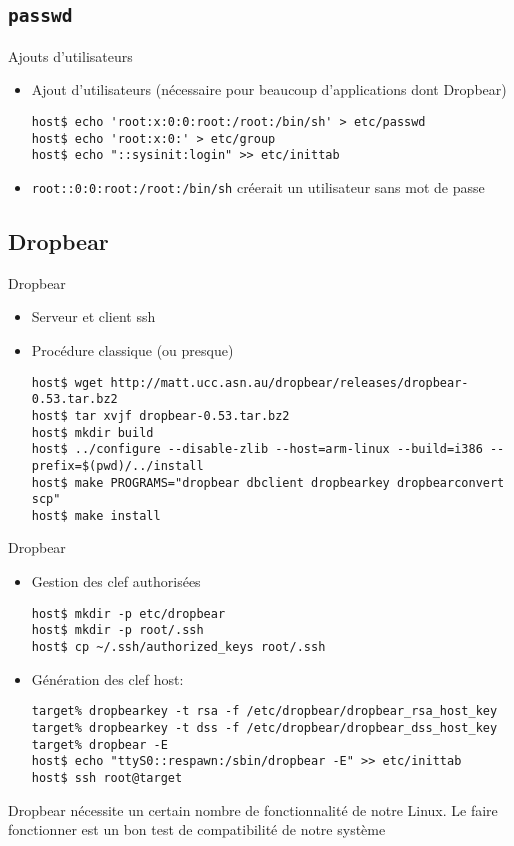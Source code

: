 \subsection{\texttt{passwd}}

\begin{frame}[fragile=singleslide]{Ajouts d'utilisateurs}
  \begin{itemize}
  \item Ajout d'utilisateurs  (nécessaire pour beaucoup d'applications
    dont Dropbear)
    \begin{lstlisting}
host$ echo 'root:x:0:0:root:/root:/bin/sh' > etc/passwd
host$ echo 'root:x:0:' > etc/group
host$ echo "::sysinit:login" >> etc/inittab
    \end{lstlisting}
  \item  \verb'root::0:0:root:/root:/bin/sh'  créerait un  utilisateur
    sans mot de passe
  \end{itemize}
\end{frame}

\subsection{Dropbear}

\begin{frame}[fragile=singleslide]{Dropbear}
  \begin{itemize}
  \item Serveur et client ssh
  \item Procédure classique (ou presque)
    \begin{lstlisting}
host$ wget http://matt.ucc.asn.au/dropbear/releases/dropbear-0.53.tar.bz2
host$ tar xvjf dropbear-0.53.tar.bz2
host$ mkdir build
host$ ../configure --disable-zlib --host=arm-linux --build=i386 --prefix=$(pwd)/../install
host$ make PROGRAMS="dropbear dbclient dropbearkey dropbearconvert scp"
host$ make install
    \end{lstlisting}
  \end{itemize}
\end{frame}

\begin{frame}[fragile=singleslide]{Dropbear}
  \begin{itemize}
  \item Gestion des clef authorisées
    \begin{lstlisting}
host$ mkdir -p etc/dropbear
host$ mkdir -p root/.ssh
host$ cp ~/.ssh/authorized_keys root/.ssh
    \end{lstlisting}%
  \item Génération des clef host:
    \begin{lstlisting}
target% dropbearkey -t rsa -f /etc/dropbear/dropbear_rsa_host_key
target% dropbearkey -t dss -f /etc/dropbear/dropbear_dss_host_key
target% dropbear -E
host$ echo "ttyS0::respawn:/sbin/dropbear -E" >> etc/inittab
host$ ssh root@target
    \end{lstlisting}
  \end{itemize}
  Dropbear  nécessite un  certain  nombre de  fonctionnalité de  notre
  Linux.  Le faire  fonctionner est  un bon  test de  compatibilité de
  notre système
\end{frame}

